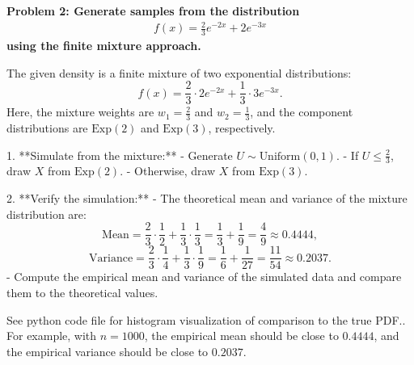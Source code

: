 \documentclass[12pt]{article}
\begin{document}
\pagebreak

\begin{homeworkProblem}
\textbf{Problem 2: Generate samples from the distribution
\begin{gather}
    f(x) = \frac{2}{3}e^{-2x} + 2e^{-3x}
\end{gather}
using the finite mixture approach.}

\begin{solution}
The given density is a finite mixture of two exponential distributions:
\[
f(x) = \frac{2}{3} \cdot 2e^{-2x} + \frac{1}{3} \cdot 3e^{-3x}.
\]
Here, the mixture weights are \( w_1 = \frac{2}{3} \) and \( w_2 = \frac{1}{3} \), and the component distributions are \( \text{Exp}(2) \) and \( \text{Exp}(3) \), respectively.

1. **Simulate from the mixture:**
   - Generate \( U \sim \text{Uniform}(0,1) \).
   - If \( U \leq \frac{2}{3} \), draw \( X \) from \( \text{Exp}(2) \).
   - Otherwise, draw \( X \) from \( \text{Exp}(3) \).

2. **Verify the simulation:**
   - The theoretical mean and variance of the mixture distribution are:
     \[
     \text{Mean} = \frac{2}{3} \cdot \frac{1}{2} + \frac{1}{3} \cdot \frac{1}{3} = \frac{1}{3} + \frac{1}{9} = \frac{4}{9} \approx 0.4444,
     \]
     \[
     \text{Variance} = \frac{2}{3} \cdot \frac{1}{4} + \frac{1}{3} \cdot \frac{1}{9} = \frac{1}{6} + \frac{1}{27} = \frac{11}{54} \approx 0.2037.
     \]
   - Compute the empirical mean and variance of the simulated data and compare them to the theoretical values.

   See python code file for histogram visualization of comparison to the true PDF.. For example, with \( n = 1000 \), the empirical mean should be close to \( 0.4444 \), and the empirical variance should be close to \( 0.2037 \).
\end{solution}
\end{homeworkProblem}

\pagebreak
\end{document}

